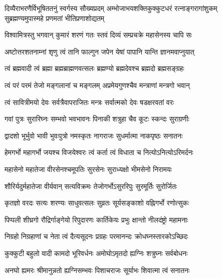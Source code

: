 
{दिव्यैराभरणैर्विभूषिततनुं स्वर्गस्य सौख्यप्रदम्}
{अम्भोजाभयशक्तिकुक्कुटधरं रत्नाङ्गरागांशुकम्}
{सुब्रह्मण्यमुपास्महे प्रणमतां भीतिप्रणाशोद्यतम्}

\begin{minipage}{\linewidth}
\twolineshloka
{विश्वामित्रस्तु भगवान् कुमारं शरणं गतः}
{स्तवं दिव्यं सम्प्रचक्रे महासेनस्य चापि सः}
\end{minipage}

\twolineshloka
{अष्टोत्तरशतनाम्नां शृणु त्वं तानि फाल्गुन}
{जपेन येषां पापानि यान्ति ज्ञानमवाप्नुयात्}

\twolineshloka
{त्वं ब्रह्मवादी त्वं ब्रह्मा ब्रह्मब्राह्मणवत्सलः}
{ब्रह्मण्यो ब्रह्मदेवश्च ब्रह्मदो ब्रह्मसङ्ग्रहः}

\twolineshloka
{त्वं परं परमं तेजो मङ्गलानां च मङ्गलम्}
{अप्रमेयगुणश्चैव मन्त्राणां मन्त्रगो भवान्}

\twolineshloka
{त्वं सावित्रीमयो देवः सर्वत्रैवापराजितः}
{मन्त्रः सर्वात्मको देवः षडक्षरवतां वरः}

\twolineshloka
{गवां पुत्रः सुरारिघ्नः सम्भवो भवभावनः}
{पिनाकी शत्रुहा चैव कूटः स्कन्दः सुराग्रणीः}

\twolineshloka
{द्वादशो भूर्भुवो भावी भुवःपुत्रो नमस्कृतः}
{नागराजः सुधर्मात्मा नाकपृष्ठः सनातनः}

\twolineshloka
{हेमगर्भो महागर्भो जयश्च विजयेश्वरः}
{त्वं कर्ता त्वं विधाता च नित्योऽनित्योऽरिमर्दनः}

\twolineshloka
{महासेनो महातेजा वीरसेनश्चमूपतिः}
{सुरसेनः सुराध्यक्षो भीमसेनो निरामयः}

\twolineshloka
{शौरिर्यदुर्महातेजा वीर्यवान् सत्यविक्रमः}
{तेजोगर्भोऽसुररिपुः सुरमूर्तिः सुरोर्जितः}

\twolineshloka
{कृतज्ञो वरदः सत्यः शरण्यः साधुवत्सलः}
{सुव्रतः सूर्यसङ्काशो वह्निगर्भो रणोत्सुकः}

\twolineshloka
{पिप्पली शीघ्रगो रौद्रिर्गाङ्गेयो रिपुदारणः}
{कार्तिकेयः प्रभुः क्षान्तो नीलदंष्ट्रो महामनाः}

\twolineshloka
{निग्रहो निग्रहाणां च नेता त्वं दैत्यसूदनः}
{प्रग्रहः परमानन्दः क्रोधघ्नस्तारकोऽच्छिदः}

\twolineshloka
{कुक्कुटी बहुलो वादी कामदो भूरिवर्धनः}
{अमोघोऽमृतदो ह्यग्निः शत्रुघ्नः सर्वबोधनः}

\twolineshloka
{अनघो ह्यमरः श्रीमानुन्नतो ह्यग्निसम्भवः}
{पिशाचराजः सूर्याभः शिवात्मा त्वं सनातनः}

